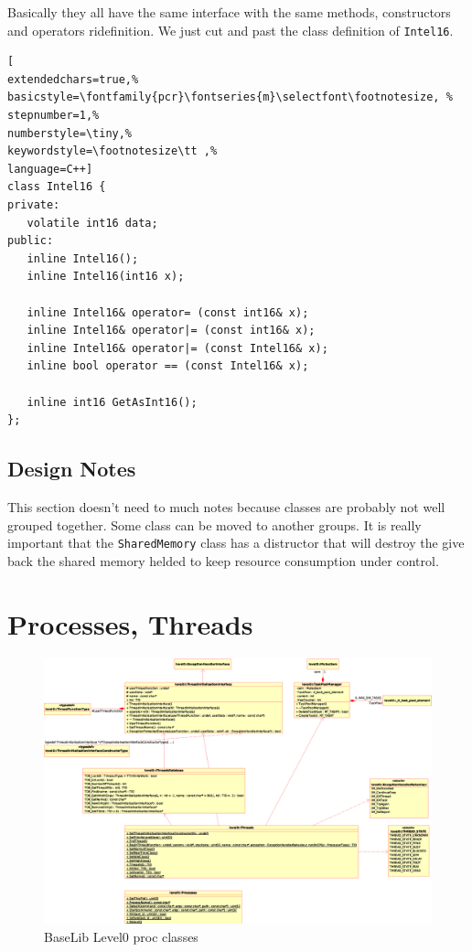 Basically they all have the same interface with the same methods, constructors and operators ridefinition. We just cut and past the class definition of \texttt{Intel16}.

\begin{lstlisting}[
extendedchars=true,%
basicstyle=\fontfamily{pcr}\fontseries{m}\selectfont\footnotesize, %
stepnumber=1,%
numberstyle=\tiny,%
keywordstyle=\footnotesize\tt ,%
language=C++]
class Intel16 {
private:
   volatile int16 data;
public:
   inline Intel16();
   inline Intel16(int16 x);

   inline Intel16& operator= (const int16& x);
   inline Intel16& operator|= (const int16& x);
   inline Intel16& operator|= (const Intel16& x);
   inline bool operator == (const Intel16& x);

   inline int16 GetAsInt16();
};
\end{lstlisting}



\subsection{Design Notes}
This section doesn't need to much notes because classes are probably not well grouped together. Some class can be moved to another groups.
It is really important that the \texttt{SharedMemory} class has a distructor that will destroy the give back the shared memory helded to keep resource consumption under control.



\section{Processes, Threads}

\begin{figure}[h!]
 \begin{center}
  \includegraphics[width=\textwidth]{level0/level0-proc.eps}
  \caption{BaseLib Level0 proc classes}
  \label{f:level0:proc}
 \end{center}
\end{figure}

